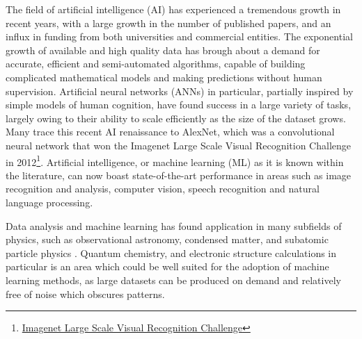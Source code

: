 The field of artificial intelligence (AI) has experienced a tremendous
growth in recent years, with a large growth in the number of published
papers, and an influx in funding from both universities and
commercial entities.
The exponential growth of available and high quality
data has brough about a demand for accurate, efficient
and semi-automated algorithms, capable of building complicated
mathematical models and making predictions without human supervision.
Artificial neural networks (ANNs) in particular, partially inspired by simple
models of human cognition, have found success in a large variety
of tasks, largely owing to their ability to scale efficiently
as the size of the dataset grows.
Many trace this recent AI renaissance to
AlexNet\cite{NIPS2012_4824},
which was a convolutional neural network that won the
Imagenet Large Scale Visual Recognition Challenge in 2012\footnote{
    \href{http://www.image-net.org/challenges/LSVRC/}{Imagenet Large Scale
    Visual Recognition Challenge}}.
Artificial intelligence, or machine learning (ML) as it is known within
the literature, can now boast state-of-the-art performance in areas such
as image recognition and analysis, computer vision, speech recognition
and natural language processing\cite{DBLP:journals/corr/abs-1803-01164}.
\par
Data analysis and machine learning has found application
in many subfields of physics, such as observational astronomy,
condensed matter, and subatomic particle physics
\cite{ball2010data}\cite{carrasquilla2017machine}\cite{
    baldi2014searching}.
Quantum chemistry, and electronic structure calculations in particular
is an area which could be well suited for the
adoption of machine learning methods, as large datasets
can be produced on demand and relatively free of noise which
obscures patterns.

